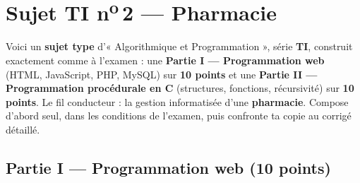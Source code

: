 \section{Sujet TI n\textsuperscript{o}\,2 — Pharmacie}

\begin{synthese}
Voici un \textbf{sujet type} d'« Algorithmique et Programmation », série \textbf{TI},
construit exactement comme à l'examen : une \textbf{Partie I — Programmation web}
(HTML, JavaScript, PHP, MySQL) sur \textbf{10 points} et une \textbf{Partie II —
Programmation procédurale en C} (structures, fonctions, récursivité) sur
\textbf{10 points}. Le fil conducteur : la gestion informatisée d'une
\textbf{pharmacie}. Compose d'abord seul, dans les conditions de l'examen, puis
confronte ta copie au corrigé détaillé.
\end{synthese}

\begin{center}
\end{center}

\subsection*{Partie I — Programmation web \hfill (10 points)}

